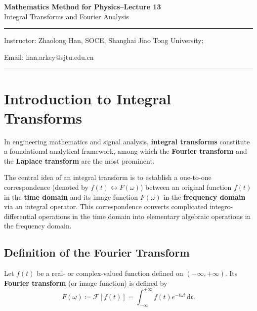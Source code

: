 \documentclass[11pt,a4paper]{article}
\theoremstyle{definition}
\theoremstyle{plain}
\begin{document}
\begin{center}
    {\LARGE \textbf{Mathematics Method for Physics--Lecture 13}} \\[0.6em]
    {\large Integral Transforms and Fourier Analysis}
\end{center}

\vspace{-0.5em}
\noindent\rule{\textwidth}{0.5pt}
\vspace{0.3em}

\begin{center}
    Instructor: Zhaolong Han, SOCE, Shanghai Jiao Tong University;
\end{center}

\vspace{-0.6em}
\noindent Email: han.arkey@sjtu.edu.cn

\vspace{0.4em}
\noindent\rule{\textwidth}{0.5pt}

\vspace{0.8em}

\section{Introduction to Integral Transforms}

In engineering mathematics and signal analysis, \textbf{integral transforms} constitute a foundational analytical framework, among which the \textbf{Fourier transform} and the \textbf{Laplace transform} are the most prominent.

The central idea of an integral transform is to establish a one-to-one correspondence (denoted by $f(t) \leftrightarrow F(\omega)$) between an original function $f(t)$ in the \textbf{time domain} and its image function $F(\omega)$ in the \textbf{frequency domain} via an integral operator. This correspondence converts complicated integro-differential operations in the time domain into elementary algebraic operations in the frequency domain.

\subsection{Definition of the Fourier Transform}

Let $f(t)$ be a real- or complex-valued function defined on $(-\infty, +\infty)$. Its \textbf{Fourier transform} (or image function) is defined by
\begin{equation}
F(\omega) \coloneqq \mathcal{F}[f(t)] = \int_{-\infty}^{+\infty} f(t) e^{-i\omega t} \, \mathrm{d}t.
\end{equation}
\end{document}
